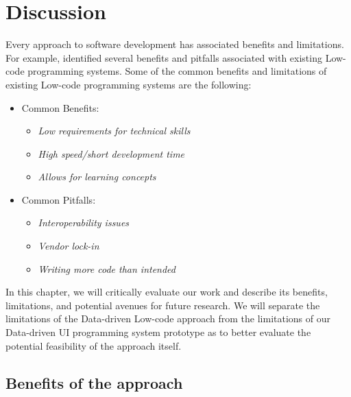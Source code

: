 \chapter{Discussion}
\label{chap:discussion}

Every approach to software development has associated benefits and limitations.
For example, \citet{Pinho_Aguiar_Amaral_2023} identified several benefits and pitfalls associated with existing Low-code programming systems.
Some of the common benefits and limitations of existing Low-code programming systems are the following:
\begin{itemize}
	\item Common Benefits:
	      \begin{itemize}
		      \item \emph{Low requirements for technical skills}
		      \item \emph{High speed/short development time}
		      \item \emph{Allows for learning concepts}
	      \end{itemize}

	\item Common Pitfalls:
	      \begin{itemize}
		      \item \emph{Interoperability issues}
		      \item \emph{Vendor lock-in}
		      \item \emph{Writing more code than intended}
	      \end{itemize}
\end{itemize}


In this chapter, we will critically evaluate our work and describe its benefits, limitations, and potential avenues for future research.
We will separate the limitations of the Data-driven Low-code approach from the limitations of our Data-driven UI programming system prototype as to
better evaluate the potential feasibility of the approach itself.

\section{Benefits of the approach}


